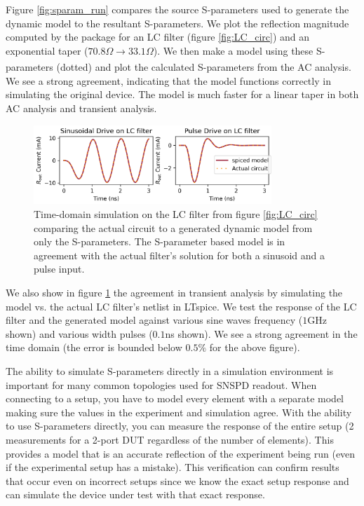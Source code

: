 Figure \ref{fig:sparam_run} compares the source S-parameters used to generate the dynamic
model to the resultant S-parameters. 
We plot the reflection magnitude computed by the  package for an LC
filter (figure \ref{fig:LC_circ}) and an exponential taper ($70.8\Omega \xrightarrow[]{} 33.1\Omega$).
We then make a  model using these
S-parameters (dotted) and plot the calculated S-parameters from the AC analysis.
We see a strong agreement, indicating that the model
functions correctly in simulating the original device. The model is much faster for a linear 
taper in both AC analysis and transient analysis.

\begin{figure}
    \centering
    \includegraphics[width=0.8\textwidth]{figs/td_LC.png}
    \caption{Time-domain simulation on the LC filter from figure \ref{fig:LC_circ} comparing the actual circuit to a  generated dynamic model from only the S-parameters. The S-parameter based model is in agreement with the actual filter's solution for both a sinusoid
    and a pulse input.}
    \label{fig:td_sparam}
\end{figure}

We also show in figure \ref{fig:td_sparam} the agreement in transient analysis by
simulating the  model vs. the actual LC filter's netlist in LTspice.
We test the response of the LC filter and the  generated model against
various sine waves frequency ($1$GHz shown) and various width pulses ($0.1$ns shown).
We see a strong agreement in the time domain (the error is bounded below $0.5\%$ for 
the above figure).

The ability to simulate S-parameters directly in a simulation environment is important
for many common topologies used for SNSPD readout. When connecting to a setup, you have to
model every element with a separate model making sure the values in the experiment and simulation
agree. With the ability to use S-parameters directly, you can measure the response of the entire setup
(2 measurements for a 2-port DUT regardless of the number of elements). 
This provides a model that is an accurate reflection of the experiment being 
run (even if the experimental setup has a mistake). This verification
can confirm results that occur even on incorrect setups since we know the exact setup response
and can simulate the device under test with that exact response. 

